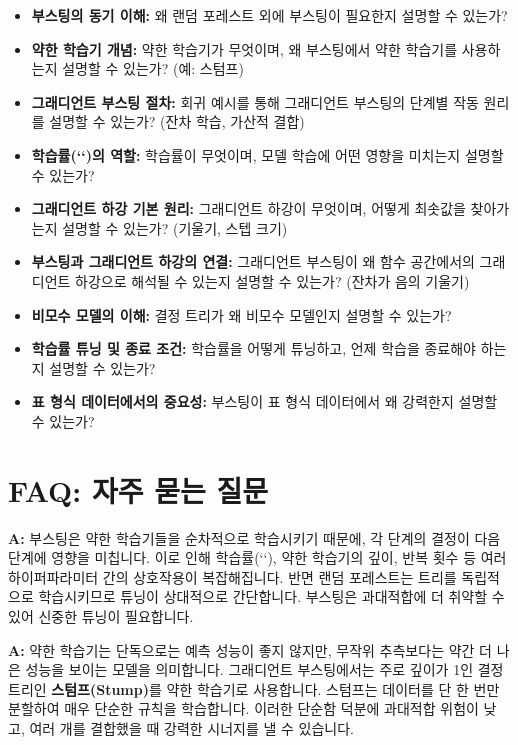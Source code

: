 \documentclass[11pt,a4paper]{article}
\begin{document}
\begin{itemize}
    \item \textbf{부스팅의 동기 이해:} 왜 랜덤 포레스트 외에 부스팅이 필요한지 설명할 수 있는가?
    \item \textbf{약한 학습기 개념:} 약한 학습기가 무엇이며, 왜 부스팅에서 약한 학습기를 사용하는지 설명할 수 있는가? (예: 스텀프)
    \item \textbf{그래디언트 부스팅 절차:} 회귀 예시를 통해 그래디언트 부스팅의 단계별 작동 원리를 설명할 수 있는가? (잔차 학습, 가산적 결합)
    \item \textbf{학습률(`\lambda`)의 역할:} 학습률이 무엇이며, 모델 학습에 어떤 영향을 미치는지 설명할 수 있는가?
    \item \textbf{그래디언트 하강 기본 원리:} 그래디언트 하강이 무엇이며, 어떻게 최솟값을 찾아가는지 설명할 수 있는가? (기울기, 스텝 크기)
    \item \textbf{부스팅과 그래디언트 하강의 연결:} 그래디언트 부스팅이 왜 함수 공간에서의 그래디언트 하강으로 해석될 수 있는지 설명할 수 있는가? (잔차가 음의 기울기)
    \item \textbf{비모수 모델의 이해:} 결정 트리가 왜 비모수 모델인지 설명할 수 있는가?
    \item \textbf{학습률 튜닝 및 종료 조건:} 학습률을 어떻게 튜닝하고, 언제 학습을 종료해야 하는지 설명할 수 있는가?
    \item \textbf{표 형식 데이터에서의 중요성:} 부스팅이 표 형식 데이터에서 왜 강력한지 설명할 수 있는가?
\end{itemize}

\newpage
\section{FAQ: 자주 묻는 질문}

\begin{tcolorbox}[colback=myblue!10, colframe=blue!50!black, title=\textbf{Q: 왜 부스팅이 랜덤 포레스트보다 튜닝하기 어려운가요?}]
\textbf{A:} 부스팅은 약한 학습기들을 순차적으로 학습시키기 때문에, 각 단계의 결정이 다음 단계에 영향을 미칩니다. 이로 인해 학습률(`\lambda`), 약한 학습기의 깊이, 반복 횟수 등 여러 하이퍼파라미터 간의 상호작용이 복잡해집니다. 반면 랜덤 포레스트는 트리를 독립적으로 학습시키므로 튜닝이 상대적으로 간단합니다. 부스팅은 과대적합에 더 취약할 수 있어 신중한 튜닝이 필요합니다.
\end{tcolorbox}

\begin{tcolorbox}[colback=myblue!10, colframe=blue!50!black, title=\textbf{Q: 약한 학습기(Weak Learner)란 정확히 무엇인가요?}]
\textbf{A:} 약한 학습기는 단독으로는 예측 성능이 좋지 않지만, 무작위 추측보다는 약간 더 나은 성능을 보이는 모델을 의미합니다. 그래디언트 부스팅에서는 주로 깊이가 1인 결정 트리인 \textbf{스텀프(Stump)}를 약한 학습기로 사용합니다. 스텀프는 데이터를 단 한 번만 분할하여 매우 단순한 규칙을 학습합니다. 이러한 단순함 덕분에 과대적합 위험이 낮고, 여러 개를 결합했을 때 강력한 시너지를 낼 수 있습니다.
\end{tcolorbox}
\end{document}
